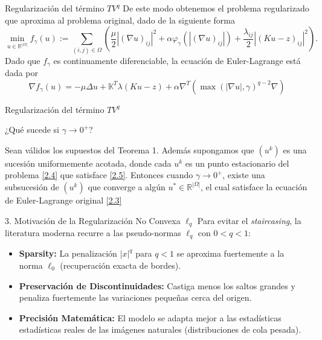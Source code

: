 \documentclass[aspectratio=169,11pt]{beamer}
\begin{document}
\begin{frame}{Regularización del término $TV^q$}
    De este modo obtenemos el problema regularizado que aproxima al problema original, dado de la siguiente forma 
    \begin{equation}
    \min_{u\in\mathbb{R}^{|\Omega|}}f_{\gamma}(u):=\sum_{(i,j)\in \Omega}\left(\frac{\mu}{2}|(\nabla u)_{ij}|^2+\alpha\varphi_\gamma(|(\nabla u)_{ij}|)+\frac{\lambda_{ij}}{2}|(Ku-z)_{ij}|^2\right).
    \label{2.4}
    \end{equation}
    Dado que $f_\gamma$ es continuamente diferenciable, la ecuación de Euler-Lagrange está dada por 
    \begin{equation}
     \nabla f_\gamma(u)=-\mu\Delta u+\mathbb{K}^T\lambda(Ku-z)+\alpha \nabla^T(\max(|\nabla u|,\gamma)^{q-2}\nabla)
   \label{2.5} 
    \end{equation}
\end{frame}

\begin{frame}{Regularización del término $TV^q$}

    ¿Qué sucede si $\gamma\to 0^+$?
    \begin{theorem}[Teorema 2]
        Sean válidos los supuestos del Teorema 1. Además supongamos que $(u^k)$ es una sucesión uniformemente acotada, donde cada $u^k$ es un punto estacionario del problema \eqref{2.4} que satisface \eqref{2.5}. Entonces cuando $\gamma\to 0^+$, existe una subsucesión de $(u^k)$ que converge a algún $u^*\in \mathbb{R}^|\Omega|$, el cual satisface la ecuación de Euler-Lagrange original \eqref{2.3}
    \end{theorem}
\end{frame}

\begin{frame}{3. Motivación de la Regularización No Convexa $\ell_q$}
    Para evitar el \textit{staircasing}, la literatura moderna recurre a las pseudo-normas $\ell_q$ con $0 < q < 1$:
    \begin{itemize}
        \item \textbf{Sparsity:} La penalización $|x|^q$ para $q < 1$ se aproxima fuertemente a la norma $\ell_0$ (recuperación exacta de bordes).
        \item \textbf{Preservación de Discontinuidades:} Castiga menos los saltos grandes y penaliza fuertemente las variaciones pequeñas cerca del origen.
        \item \textbf{Precisión Matemática:} El modelo se adapta mejor a las estadísticas estadísticas reales de las imágenes naturales (distribuciones de cola pesada).
    \end{itemize}
\end{frame}
\end{document}
